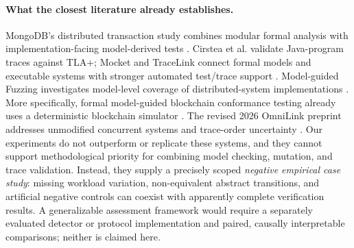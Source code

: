\paragraph{What the closest literature already establishes.}
MongoDB's distributed transaction study combines modular formal analysis
with implementation-facing model-derived tests
\cite{schultz2025mongodb}. Cirstea et al. validate Java-program traces
against TLA+; Mocket and TraceLink connect formal models and executable
systems with stronger automated test/trace support
\cite{cirstea2025traces,wang2023mocket,hackett2025tracelink}.
Model-guided Fuzzing investigates model-level coverage of distributed-system
implementations \cite{gulcan2025modelfuzz}. More specifically, formal
model-guided blockchain conformance testing already uses a deterministic
blockchain simulator \cite{drobnjakovic2025blockchains}. The revised 2026
OmniLink preprint addresses unmodified concurrent systems and trace-order
uncertainty \cite{hackett2026omnilink}.
Our experiments do not outperform or replicate these systems, and they cannot
support methodological priority for combining model checking, mutation, and
trace validation. Instead, they supply a precisely scoped \emph{negative
empirical case study}: missing workload variation, non-equivalent abstract
transitions, and artificial negative controls can coexist with apparently
complete verification results. A generalizable assessment framework would
require a separately evaluated detector or protocol implementation and
paired, causally interpretable comparisons; neither is claimed here.

